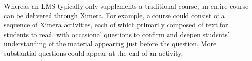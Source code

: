 \documentclass{ximera}
\begin{document}
Whereas an LMS typically only supplements a traditional course,
an entire course can be delivered through
\href{http://ximera.osu.edu}{\sf Ximera}.
For example, a course could consist of a sequence
of \href{http://ximera.osu.edu}{\sf Ximera}
activities, each of which primarily composed of text
for students to read, with occasional 
questions to confirm and deepen students' understanding of the
material appearing just before the question.
More substantial questions could appear at the end of an activity.
\end{document}
